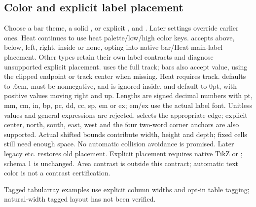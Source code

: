 \subsection{Color and explicit label placement}
Choose a bar theme, a solid , or explicit
,  and . Later settings override
earlier ones. Heat continues to use heat palette/low/high color keys.
 accepts above, below, left, right, inside or none, opting into native bar/Heat
main-label placement. Other types retain their own label contracts and diagnose
unsupported explicit placement.  uses the full track;
bars also accept value, using the clipped endpoint or track center when missing.
Heat requires track.  defaults to .6em, must be nonnegative,
and is ignored inside.  and  default to 0pt,
with positive values moving right and up. Lengths are signed decimal numbers with
pt, mm, cm, in, bp, pc, dd, cc, sp, em or ex; em/ex use the actual label font.
Unitless values and general expressions are rejected.
 selects the appropriate edge; explicit center, north,
south, east, west and the four two-word corner anchors are also supported.
Actual shifted bounds contribute width, height and depth; fixed cells still need
enough space. No automatic collision avoidance is promised. Later legacy
 etc. restores old placement. Explicit placement requires
native TikZ or ; schema 1 is unchanged. Area contrast
is outside this contract; automatic text color is not a contrast certification.

Tagged tabularray examples use explicit column widths and opt-in table tagging; natural-width tagged layout has not been verified.
